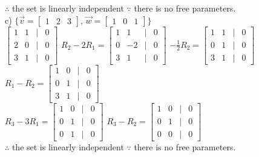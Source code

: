 \documentclass[a4paper]{article}
\begin{document}
$\therefore$ the set is linearly independent $\because$ there is no free parameters.\\
c) $\{\vec{v} = \begin{bmatrix}
1&2&3
\end{bmatrix}$, $\vec{w} = \begin{bmatrix}
1&0&1
\end{bmatrix}\}$\\
$\begin{bmatrix}
1&1&|&0\\
2&0&|&0\\
3&1&|&0
\end{bmatrix}$ $R_2 - 2R_1 = \begin{bmatrix}
1&1&|&0\\
0&-2&|&0\\
3&1&|&0
\end{bmatrix}$ $-\frac{1}{2}R_2 = \begin{bmatrix}
1&1&|&0\\
0&1&|&0\\
3&1&|&0
\end{bmatrix}$ $R_1 - R_2 = \begin{bmatrix}
1&0&|&0\\
0&1&|&0\\
3&1&|&0
\end{bmatrix}$\\
$R_3 - 3R_1 = \begin{bmatrix}
1&0&|&0\\
0&1&|&0\\
0&1&|&0
\end{bmatrix}$ $R_3 - R_2 = \begin{bmatrix}
1&0&|&0\\
0&1&|&0\\
0&0&|&0
\end{bmatrix}$\\
$\therefore$ the set is linearly independent $\because$ there is no free parameters.\\
\end{document}
